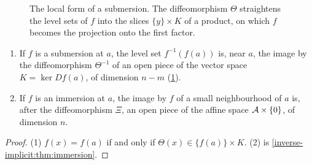 \begin{notechapter}
\begin{figure}[ht]
\centering
{}
\caption{The local form of a submersion. The diffeomorphism $\Theta$
straightens the level sets of $f$ into the slices
$\{y\}\times K$ of a product, on which $f$ becomes the projection onto
the first factor.}
\label{inverse-implicit:fig:submersion}
\end{figure}

\begin{corollary}
\label{inverse-implicit:cor:sets}
\begin{enumerate}[nosep]
  \item If $f$ is a submersion at $a$, the level set
        $f^{-1}(f(a))$ is, near $a$, the image by the diffeomorphism
        $\Theta^{-1}$ of an open piece of the vector space
        $K = \ker Df(a)$, of dimension $n - m$
        (\cref{inverse-implicit:fig:submersion}).
  \item If $f$ is an immersion at $a$, the image by $f$ of a small
        neighbourhood of $a$ is, after the diffeomorphism $\Xi$, an open
        piece of the affine space $\mathcal{A}\times\{0\}$, of dimension $n$.
\end{enumerate}
\end{corollary}

\begin{proof}
(1) $f(x) = f(a)$ if and only if $\Theta(x)\in\{f(a)\}\times K$. (2) is
\cref{inverse-implicit:thm:immersion}.
\end{proof}


\end{notechapter}
